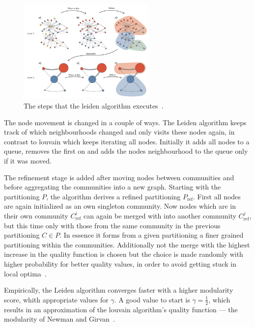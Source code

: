             \begin{figure}[htp]
                \begin{center}
                    \includegraphics[keepaspectratio,width=0.6\textwidth]{img/03-graphs/leiden.png}
                \end{center}
                \caption{The steps that the leiden algorithm executes~\autocite{traag2019louvain}.} 
                \label{leiden-fig}
            \end{figure}
            
            The node movement is changed in a couple of ways.
            The Leiden algorithm keeps track of which neighbourhoods changed and only visits these nodes again, in contrast to louvain which keeps iterating all nodes\autocite{movb, movc}.
            Initially it adds all nodes to a queue, removes the first on and adds the nodes neighbourhood to the queue only if it was moved.
            
            The refinement stage is added after moving nodes between communities and before aggregating the communities into a new graph.
            Starting with the partitioning $P$, the algorithm derives a refined partitioning $P_{\text{ref}}$.
            First all nodes are again initialized as an own singleton community. 
            Now nodes which are in their own community $C^i_{\text{ref}}$ can again be merged with into another community $C^j_{\text{ref}}$, but this time only with those from the same community in the previous partitioning $C \in P$. 
            In essence it forms from a given partitioning a finer grained partitioning within the communities.
            Additionally not the merge with the highest increase in the quality function is chosen but the choice is made randomly with higher probability for better quality values, in order to avoid getting stuck in local optima~\autocite{mova}.
            
            Empirically, the Leiden algorithm converges faster with a higher modularity score, whith appropriate values for $\gamma$. A good value to start is $\gamma = \frac{1}{2}$, which results in an approximation of the louvain algorithm's quality function --- the modularity of Newman and Girvan~\autocite{girvan2002community}.
                
